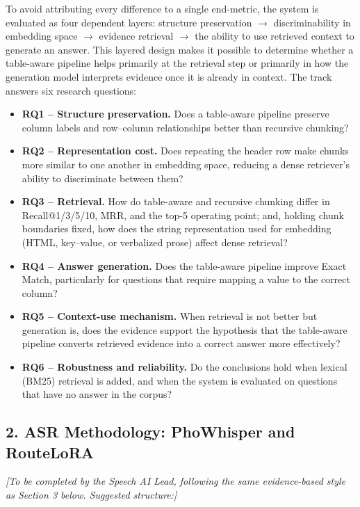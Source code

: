 \documentclass[11pt,a4paper]{article}
\newcommand{\guidance}[1]{%
  {\color{guidanceblue}\itshape [#1]\par}%
}
\begin{document}
To avoid attributing every difference to a single end-metric, the system is
evaluated as four dependent layers: structure preservation
$\rightarrow$ discriminability in embedding space $\rightarrow$ evidence
retrieval $\rightarrow$ the ability to use retrieved context to generate an
answer. This layered design makes it possible to determine whether a
table-aware pipeline helps primarily at the retrieval step or primarily in
how the generation model interprets evidence once it is already in context.
The track answers six research questions:

\begin{itemize}
  \item \textbf{RQ1 -- Structure preservation.} Does a table-aware pipeline
  preserve column labels and row--column relationships better than recursive
  chunking?
  \item \textbf{RQ2 -- Representation cost.} Does repeating the header row
  make chunks more similar to one another in embedding space, reducing a
  dense retriever's ability to discriminate between them?
  \item \textbf{RQ3 -- Retrieval.} How do table-aware and recursive chunking
  differ in Recall@1/3/5/10, MRR, and the top-5 operating point; and, holding
  chunk boundaries fixed, how does the string representation used for
  embedding (HTML, key--value, or verbalized prose) affect dense retrieval?
  \item \textbf{RQ4 -- Answer generation.} Does the table-aware pipeline
  improve Exact Match, particularly for questions that require mapping a
  value to the correct column?
  \item \textbf{RQ5 -- Context-use mechanism.} When retrieval is not better
  but generation is, does the evidence support the hypothesis that the
  table-aware pipeline converts retrieved evidence into a correct answer more
  effectively?
  \item \textbf{RQ6 -- Robustness and reliability.} Do the conclusions hold
  when lexical (BM25) retrieval is added, and when the system is evaluated on
  questions that have no answer in the corpus?
\end{itemize}

\subsection{2. ASR Methodology: PhoWhisper and RouteLoRA}
\guidance{To be completed by the Speech AI Lead, following the same
evidence-based style as Section 3 below. Suggested structure:}
\end{document}
